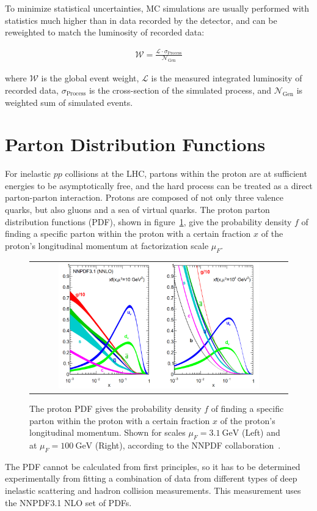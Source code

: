 To minimize statistical uncertainties, MC simulations are usually performed with statistics much higher than in data recorded by the detector, and can be reweighted to match the luminosity of recorded data:
\begin{linenomath*}
\begin{align}
\mathcal{W} = \frac{\mathcal{L} \cdot \sigma_{\text{Process}}}{\mathcal{N}_{\text{Gen}}}
\end{align}
\end{linenomath*}
where $\mathcal{W}$ is the global event weight, $\mathcal{L}$ is the measured integrated luminosity of recorded data, $\sigma_{\text{Process}}$ is the cross-section of the simulated process, and $\mathcal{N}_{\text{Gen}}$ is weighted sum of simulated events.

\section{Parton Distribution Functions}
For inelastic $pp$ collisions at the LHC, partons within the proton are at sufficient energies to be asymptotically free, and the hard process can be treated as a direct parton-parton interaction.
Protons are composed of not only three valence quarks, but also gluons and a sea of virtual quarks.
The proton parton distribution functions (PDF), shown in figure~\ref{Parton_Distribution_Functions}, give the probability density $f$ of finding a specific parton within the proton with a certain fraction $x$ of the proton's longitudinal momentum at factorization scale $\mu_F$.
\begin{figure}[!htb]
  \begin{center}
    \begin{tabular}{c}
        \includegraphics[width=0.80\textwidth]{fig_Event_Simulation/Parton_Distribution_Functions.png}
    \end{tabular}
    \caption{The proton PDF gives the probability density $f$ of finding a specific parton within the proton with a certain fraction $x$ of the proton's longitudinal momentum.
    Shown for scales $\mu_F = \SI{3.1}{\GeV}$ (Left) and at $\mu_F = \SI{100}{\GeV}$ (Right), according to the NNPDF collaboration~\cite{Ball:2267455}.
            }
    \label{Parton_Distribution_Functions}
  \end{center}
\end{figure}
The PDF cannot be calculated from first principles, so it has to be determined experimentally from fitting a combination of data from different types of deep inelastic scattering and hadron collision measurements.
This measurement uses the NNPDF3.1 NLO set of PDFs.

